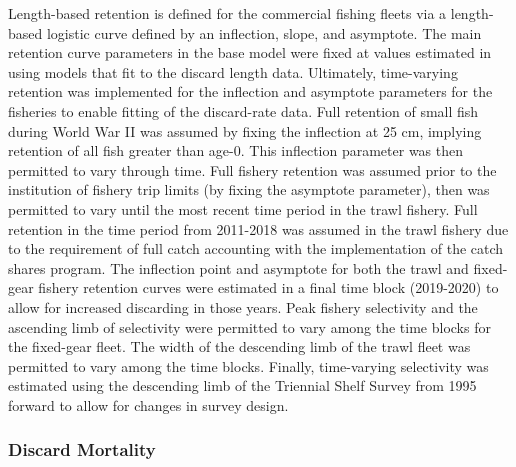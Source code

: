 \documentclass[11pt,
  english,
  a4paper,
]{article}
\begin{document}

Length-based retention is defined for the commercial fishing fleets via a length-based logistic curve defined by an inflection, slope, and asymptote. The main retention curve parameters in the base model were fixed at values estimated in using models that fit to the discard length data. Ultimately, time-varying retention was implemented for the inflection and asymptote parameters for the fisheries to enable fitting of the discard-rate data. Full retention of small fish during World War II was assumed by fixing the inflection at 25 cm, implying retention of all fish greater than age-0. This inflection parameter was then permitted to vary through time. Full fishery retention was assumed prior to the institution of fishery trip limits (by fixing the asymptote parameter), then was permitted to vary until the most recent time period in the trawl fishery. Full retention in the time period from 2011-2018 was assumed in the trawl fishery due to the requirement of full catch accounting with the implementation of the catch shares program. The inflection point and asymptote for both the trawl and fixed-gear fishery retention curves were estimated in a final time block (2019-2020) to allow for increased discarding in those years. Peak fishery selectivity and the ascending limb of selectivity were permitted to vary among the time blocks for the fixed-gear fleet. The width of the descending limb of the trawl fleet was permitted to vary among the time blocks. Finally, time-varying selectivity was estimated using the descending limb of the Triennial Shelf Survey from 1995 forward to allow for changes in survey design.

\leavevmode\tagmcend\tagstructend\par


\hypertarget{discard-mortality}{%
\subsubsection{Discard Mortality}\label{discard-mortality}}

\leavevmode\tagmcend\tagstructend
\end{document}
